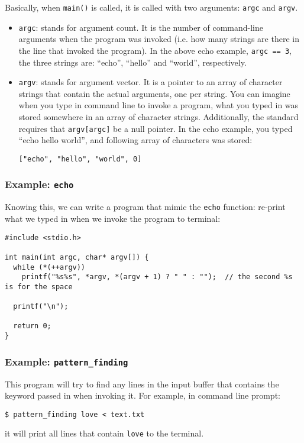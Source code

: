 \documentclass[11pt]{article}
\begin{document}
Basically, when \texttt{main()} is called, it is called with two arguments: \texttt{argc} and \texttt{argv}.
\begin{itemize}
\item \texttt{argc}: stands for argument count. It is the number of command-line arguments when the program was invoked (i.e. how many strings are there in the line that invoked the program). In the above echo example, \texttt{argc == 3}, the three strings are: ``echo'', ``hello'' and ``world'', respectively.
\item \texttt{argv}: stands for argument vector. It is a pointer to an array of character strings that contain the actual arguments, one per string. You can imagine when you type in command line to invoke a program, what you typed in was stored somewhere in an array of character strings. Additionally, the standard requires that \texttt{argv[argc]} be a null pointer. In the echo example, you typed ``echo hello world'', and following array of characters was stored:
\begin{Verbatim}[frame=single]
["echo", "hello", "world", 0]
\end{Verbatim}
\end{itemize}

\subsubsection{Example: \texttt{echo}}
\label{sec:orgc9c7356}
Knowing this, we can write a program that mimic the \texttt{echo} function: re-print what we typed in when we invoke the program to terminal:
\begin{verbatim}
#include <stdio.h>

int main(int argc, char* argv[]) {
  while (*(++argv))
    printf("%s%s", *argv, *(argv + 1) ? " " : "");  // the second %s is for the space

  printf("\n");

  return 0;
}
\end{verbatim}

\subsubsection{Example: \texttt{pattern\_finding}}
\label{sec:org4fb8138}
This program will try to find any lines in the input buffer that contains the keyword passed in when invoking it. For example, in command line prompt:
\begin{Verbatim}[frame=single]
$ pattern_finding love < text.txt
\end{Verbatim}
it will print all lines that contain \texttt{love} to the terminal.
\end{document}
